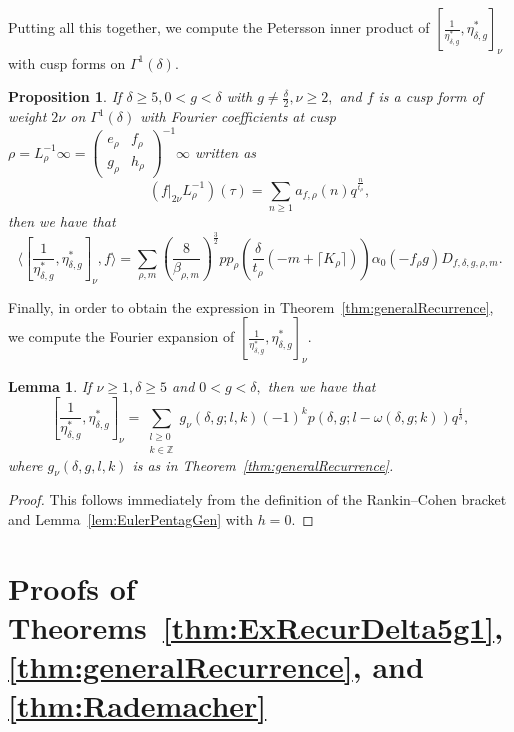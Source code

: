 \documentclass[10pt]{amsart}
\newtheorem{lemma}[theorem]{Lemma}
\newtheorem{proposition}[theorem]{Proposition}
\theoremstyle{definition}
\theoremstyle{remark}
\numberwithin{equation}{section}
\newcommand{\Z}{\mathbb Z}
\begin{document}
	Putting all this together, we compute the Petersson inner product of $\left[\frac{1}{\eta_{\delta,g}^\ast},\eta_{\delta,g}^\ast\right]_\nu$ with cusp forms on $\Gamma^1(\delta).$ 
	
	\begin{proposition}\label{prop:PeterssonInner}
		If $\delta\geq 5, 0<g<\delta$ with $g\neq\frac{\delta}{2},\nu\geq 2,$ and $f$ is a cusp form of weight $2\nu$ on $\Gamma^1(\delta)$ with Fourier coefficients at cusp $\rho=L_\rho^{-1}\infty=\begin{pmatrix}
			e_\rho & f_\rho \\
			g_\rho & h_\rho
		\end{pmatrix}^{-1}\infty$ written as
		$$
		(f|_{2\nu}L_\rho^{-1})(\tau) = \sum\limits_{n\geq 1}a_{f,\rho}(n)q^{\frac{n}{t_\rho}},
		$$
		then we have that 
		$$
		\langle[\frac{1}{\eta_{\delta,g}^\ast},\eta_{\delta,g}^\ast]_\nu,f\rangle = \sum\limits_{\rho,m}\left(\frac{8}{\beta_{\rho,m}}\right)^{\frac{3}{2}}pp_\rho\left(\frac{\delta}{t_\rho}(-m+\lceil K_\rho\rceil)\right)\alpha_0(-f_\rho g)D_{f,\delta,g,\rho,m}.
		$$
	\end{proposition}

	Finally, in order to obtain the expression in Theorem~\ref{thm:generalRecurrence}, we compute the Fourier expansion of $[\frac{1}{\eta_{\delta,g}^\ast},\eta_{\delta,g}^\ast]_\nu.$
	
	\begin{lemma}\label{lem:FourierBracket}
		If $\nu\geq 1,\delta\geq 5$ and $0<g<\delta,$ then we have that 
		$$
		[\frac{1}{\eta_{\delta,g}^\ast},\eta_{\delta,g}^\ast]_\nu=\sum\limits_{\substack{l\geq 0 \\ k\in\Z}} g_\nu(\delta,g;l,k)(-1)^kp(\delta,g;l-\omega(\delta,g;k))q^{\frac{l}{\delta}},
		$$
		where $g_\nu(\delta,g,l,k)$ is as in Theorem~\ref{thm:generalRecurrence}.
	\end{lemma}
	
	\begin{proof}
		This follows immediately from the definition of the Rankin--Cohen bracket and Lemma~\ref{lem:EulerPentagGen} with $h=0.$ 
	\end{proof}

	\section{Proofs of Theorems~\ref{thm:ExRecurDelta5g1}, \ref{thm:generalRecurrence}, and \ref{thm:Rademacher}}\label{sec:proofs}
	
\end{document}
